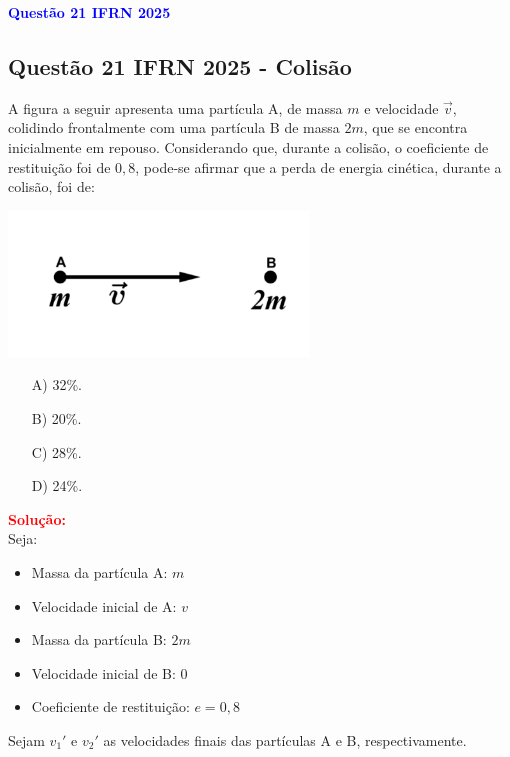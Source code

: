 \begin{flushleft}
\textbf{\textcolor{blue}{\Large Quest\~ao 21 IFRN 2025}}\\
\noindent
\subsection{Quest\~ao 21 IFRN 2025 - Colisão}
A figura a seguir apresenta uma partícula A, de massa $m$ e velocidade $\vec{v}$, 
colidindo frontalmente com uma partícula B de massa $2m$, que se encontra 
inicialmente em repouso. Considerando que, durante a colisão, o coeficiente de 
restituição foi de $0{,}8$, pode-se afirmar que a perda de energia cinética, durante a 
colisão, foi de:

\begin{center}
\includegraphics[width=0.6\textwidth]{figures/colisao.png}
\end{center}  

\begin{itemize}
\item[A)] 32\%.
\item[B)] 20\%.
\item[C)] 28\%.
\item[D)] 24\%.
\end{itemize}

\vspace{0.5cm}

\textcolor{red}{\textbf{Solução:}}\\

Seja:
\begin{itemize}
  \item Massa da partícula A: $m$
  \item Velocidade inicial de A: $v$
  \item Massa da partícula B: $2m$
  \item Velocidade inicial de B: $0$
  \item Coeficiente de restituição: $e = 0{,}8$
\end{itemize}

Sejam $v_1'$ e $v_2'$ as velocidades finais das partículas A e B, respectivamente.


\end{flushleft}
